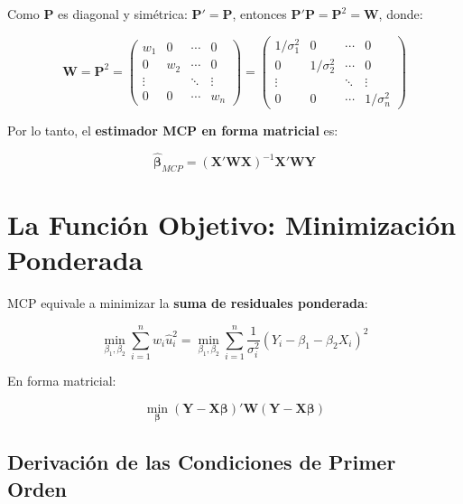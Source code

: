 \documentclass[12pt,a4paper]{article}
\begin{document}
Como $\mathbf{P}$ es diagonal y simétrica: $\mathbf{P}' = \mathbf{P}$, entonces $\mathbf{P}'\mathbf{P} = \mathbf{P}^2 = \mathbf{W}$, donde:

\begin{equation}
\mathbf{W} = \mathbf{P}^2 =
\begin{pmatrix}
w_1 & 0 & \cdots & 0 \\
0 & w_2 & \cdots & 0 \\
\vdots & & \ddots & \vdots \\
0 & 0 & \cdots & w_n
\end{pmatrix}
=
\begin{pmatrix}
1/\sigma_1^2 & 0 & \cdots & 0 \\
0 & 1/\sigma_2^2 & \cdots & 0 \\
\vdots & & \ddots & \vdots \\
0 & 0 & \cdots & 1/\sigma_n^2
\end{pmatrix}
\end{equation}

Por lo tanto, el \textbf{estimador MCP en forma matricial} es:

\begin{equation}
\boxed{\hat{\boldsymbol{\beta}}_{MCP} = (\mathbf{X}'\mathbf{W}\mathbf{X})^{-1}\mathbf{X}'\mathbf{W}\mathbf{Y}}
\end{equation}

\section{La Función Objetivo: Minimización Ponderada}

MCP equivale a minimizar la \textbf{suma de residuales ponderada}:

\begin{equation}
\min_{\beta_1,\beta_2} \sum_{i=1}^{n} w_i \hat{u}_i^2 = \min_{\beta_1,\beta_2} \sum_{i=1}^{n} \frac{1}{\sigma_i^2}(Y_i - \beta_1 - \beta_2 X_i)^2
\end{equation}

En forma matricial:

\begin{equation}
\min_{\boldsymbol{\beta}} (\mathbf{Y} - \mathbf{X}\boldsymbol{\beta})'\mathbf{W}(\mathbf{Y} - \mathbf{X}\boldsymbol{\beta})
\end{equation}

\subsection{Derivación de las Condiciones de Primer Orden}
\end{document}
